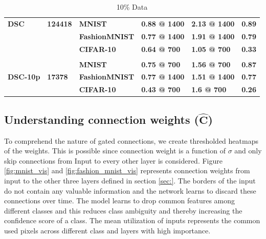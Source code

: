 \documentclass{article}
\let\oldhat\hat
\renewcommand{\hat}[1]{\oldhat{\mathbf{#1}}}
\begin{document}
\begin{table}[H]
\begin{tabular}{llllll}
\textbf{DSC}                      & \textbf{124418}                     & \textbf{MNIST}                    & \textbf{0.88 @ 1400}      & \textbf{2.13 @ 1400}  & \textbf{0.89}                     \\
\textbf{}                         & \textbf{}                           & \textbf{FashionMNIST}             & \textbf{0.77 @ 1400}      & \textbf{1.91 @ 1400}  & \textbf{0.79}                     \\
\textbf{}                         & \textbf{}                           & \textbf{CIFAR-10}                 & \textbf{0.64 @ 700}       & \textbf{1.05 @ 700}   & \textbf{0.33}                     \\
                                  &                                     &                                   &                           &                       &                                   \\
\multirow{3}{*}{\textbf{DSC-10p}} & \multirow{3}{*}{\textbf{17378}}     & \textbf{MNIST}                    & \textbf{0.75 @ 700}       & \textbf{1.56 @ 700}   & \textbf{0.87}                     \\
                                  &                                     & \textbf{FashionMNIST}             & \textbf{0.77 @ 1400}      & \textbf{1.51 @ 1400}  & \textbf{0.77}                     \\
                                  &                                     & \textbf{CIFAR-10}                 & \textbf{0.43 @ 700}       & \textbf{1.6 @ 700}    & \textbf{0.26}                     \\ \cline{3-6} 
\end{tabular}
\caption{10\% Data}
\label{tab:my-table}
\end{table}





\subsection{Understanding connection weights ($\hat{C}$)}
To comprehend the nature of gated connections, we create thresholded heatmaps of the weights. This is possible since connection weight is a function of $\sigma$ and only skip connections from Input to every other layer is considered. Figure \ref{fig:mnist_vis} and \ref{fig:fashion_mnist_vis} represents connection weights from input to the other three layers defined in section \ref{sec:}. The borders of the input do not contain any valuable information and the network learns to discard these connections over time. The model learns to drop common features among different classes and this reduces class ambiguity and thereby increasing the confidence score of a class. The mean utilization of inputs represents the common used pixels across different class and layers with high importance.
\end{document}
